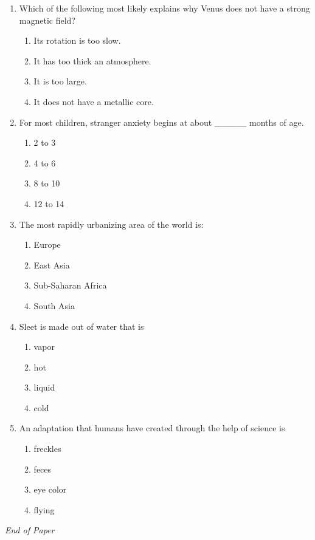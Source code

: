 \documentclass[12pt]{article}
\begin{document}
\begin{enumerate}[label=\arabic*.]
\begin{enumerate}[label=(\alph*)]
    \item chemical
    \item electrical
    \item sound
    \item mechanical
\end{enumerate}
\item Which of the following most likely explains why Venus does not have a strong magnetic field?
\begin{enumerate}[label=(\alph*)]
    \item Its rotation is too slow.
    \item It has too thick an atmosphere.
    \item It is too large.
    \item It does not have a metallic core.
\end{enumerate}
\item For most children, stranger anxiety begins at about \_\_\_\_\_ months of age.
\begin{enumerate}[label=(\alph*)]
    \item 2 to 3
    \item 4 to 6
    \item 8 to 10
    \item 12 to 14
\end{enumerate}
\item The most rapidly urbanizing area of the world is:
\begin{enumerate}[label=(\alph*)]
    \item Europe
    \item East Asia
    \item Sub-Saharan Africa
    \item South Asia
\end{enumerate}
\item Sleet is made out of water that is
\begin{enumerate}[label=(\alph*)]
    \item vapor
    \item hot
    \item liquid
    \item cold
\end{enumerate}
\item An adaptation that humans have created through the help of science is
\begin{enumerate}[label=(\alph*)]
    \item freckles
    \item feces
    \item eye color
    \item flying
\end{enumerate}
\end{enumerate}

\vfill
\noindent\textit{End of Paper}
\end{document}
